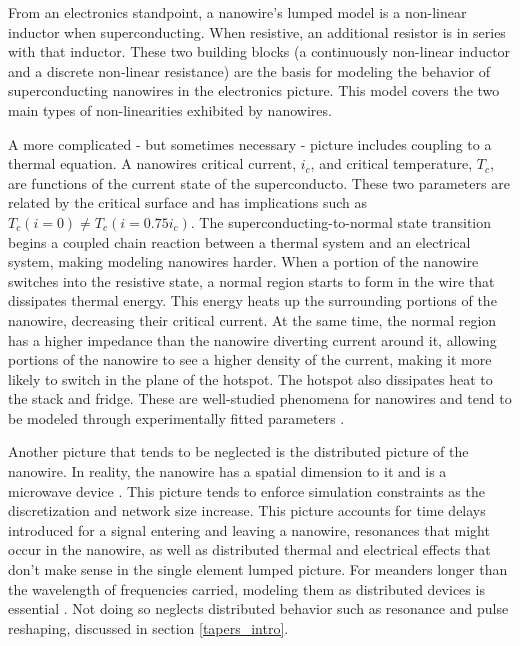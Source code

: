 \documentclass[]{article}
\newcommand{\todoexplain}[2][]{}
\begin{document}
From an electronics standpoint, a nanowire's lumped model is a non-linear inductor when superconducting. When resistive, an additional resistor is in series with that inductor.
These two building blocks (a continuously non-linear inductor and a discrete non-linear
resistance) are the basis for modeling the behavior of superconducting nanowires in
the electronics picture. This model covers the two main types of non-linearities
exhibited by nanowires.

A more complicated - but sometimes necessary - picture includes coupling to a thermal equation.
A nanowires critical current, $i_c$, and critical temperature, $T_c$, are
functions of the current state of the superconducto. These two parameters are related by the critical
surface and has implications such as $T_c(i=0) \neq T_c(i=0.75i_c)$. 
The superconducting-to-normal state transition
begins a coupled chain reaction between a thermal system and an electrical system, making
modeling nanowires harder. When a portion of the nanowire switches into the resistive 
state, a normal region starts to form in the wire that dissipates thermal energy. This
energy heats up the surrounding portions of the nanowire, decreasing their critical 
current. At the same time, the normal region has a higher impedance than the nanowire
diverting current around it, allowing portions of the nanowire to see a higher density of
the current, making it more likely to switch in the plane of the hotspot. The hotspot also
dissipates heat to the stack and fridge. These are well-studied phenomena for nanowires
and tend to be modeled through experimentally fitted parameters \cite{phen_model, karl_spice}. \todoexplain[]{maybe talk about simulating noise transition??}

Another picture that tends to be neglected is the distributed picture of the nanowire.
In reality, the nanowire has a spatial dimension to it and is a microwave device
\cite{distributed_nanowire_model, santavicca_microwave}. This
picture tends to enforce simulation constraints as the discretization and network size
increase. This picture accounts for time delays introduced for a signal entering and
leaving a nanowire, resonances that might occur in the nanowire, as well as distributed
thermal and electrical effects that don't make sense in the single element lumped picture. For meanders
longer than the wavelength of frequencies carried, modeling them as distributed devices
is essential \cite{distributed_nanowire_model}. Not doing so neglects distributed behavior such as resonance and pulse reshaping, discussed in section \ref{tapers_intro}.
\end{document}
